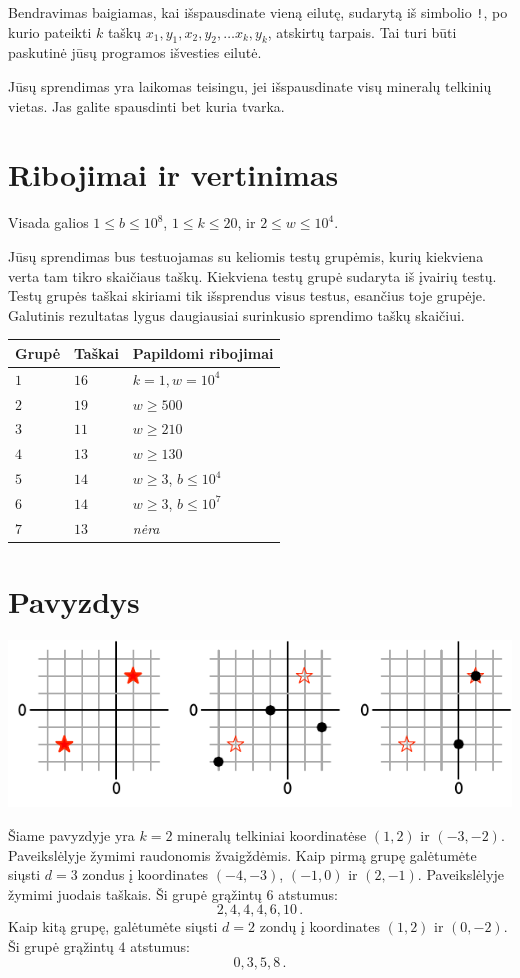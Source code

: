 Bendravimas baigiamas, kai išspausdinate vieną eilutę, sudarytą iš simbolio \texttt{!}, po kurio pateikti
$k$ taškų \newline $x_1, y_1, x_2, y_2, \ldots x_k, y_k$, atskirtų tarpais.
Tai turi būti paskutinė jūsų programos išvesties eilutė.

Jūsų sprendimas yra laikomas teisingu, jei išspausdinate visų mineralų telkinių vietas. 
Jas galite spausdinti bet kuria tvarka.

\section*{Ribojimai ir vertinimas}

Visada galios
$1\leq b \leq 10^8$, %
$1 \leq k \leq 20$, %
ir
$2 \le w \le 10^4$. %

Jūsų sprendimas bus testuojamas su keliomis testų grupėmis, kurių kiekviena verta tam tikro skaičiaus taškų.
Kiekviena testų grupė sudaryta iš įvairių testų.
Testų grupės taškai skiriami tik išsprendus visus testus, esančius toje grupėje.
Galutinis rezultatas lygus daugiausiai surinkusio sprendimo taškų skaičiui.

\medskip
\begin{tabular}{lll}
Grupė & Taškai & Papildomi ribojimai \\\hline
  $1$ & $16$ & $k = 1, w = 10^4$\\
  $2$ & $19$ & $w \ge 500$\\
  $3$ & $11$ & $w \ge 210$\\
  $4$ & $13$ & $w \ge 130$\\
  $5$ & $14$ & $w \ge 3$, $b \le 10^4$\\
  $6$ & $14$ & $w \ge 3$, $b \le 10^7$\\
  $7$ & $13$ & \emph{nėra}
\end{tabular}

\section*{Pavyzdys}

\includegraphics[width=.6\textwidth]{img/sample1.pdf}

Šiame pavyzdyje yra $k=2$ mineralų telkiniai koordinatėse $(1,2)$ ir $(-3,-2)$. Paveikslėlyje žymimi raudonomis žvaigždėmis.
Kaip pirmą grupę galėtumėte siųsti $d=3$ zondus į koordinates $(-4,-3)$, $(-1, 0)$ ir $(2,-1)$. Paveikslėlyje žymimi juodais taškais.
Ši grupė grąžintų $6$ atstumus: \[
  2, 4, 4, 4, 6, 10\,.
\]
Kaip kitą grupę, galėtumėte siųsti $d=2$ zondų į koordinates $(1,2)$ ir $(0,-2)$.
Ši grupė grąžintų $4$ atstumus: \[
  0, 3, 5, 8\,.
\]
